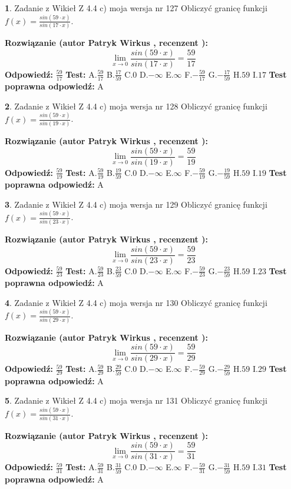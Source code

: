 \documentclass[12pt, a4paper]{article}
\theoremstyle{definition} %
\newtheorem{zad}{}
\newcommand{\zadStart}[1]{\begin{zad}#1\newline}
\newcommand{\zadStop}{\end{zad}}
\newcommand{\rozwStart}[2]{\noindent \textbf{Rozwiązanie (autor #1 , recenzent #2): }\newline}
\newcommand{\rozwStop}{\newline}
\newcommand{\odpStart}{\noindent \textbf{Odpowiedź:}\newline}
\newcommand{\odpStop}{\newline}
\newcommand{\testStart}{\noindent \textbf{Test:}\newline}
\newcommand{\testStop}{\newline}
\newcommand{\kluczStart}{\noindent \textbf{Test poprawna odpowiedź:}\newline}
\newcommand{\kluczStop}{\newline}
\begin{document}
\zadStart{Zadanie z Wikieł Z 4.4 c) moja wersja nr 127}
Obliczyć granicę funkcji $f(x)=\frac{sin(59\cdot x)}{sin(17\cdot x)}$.
\zadStop
\rozwStart{Patryk Wirkus}{}
$$\lim\limits_{x\to 0}\frac{sin(59\cdot x)}{sin(17\cdot x)}=
\frac{59}{17}$$
\rozwStop
\odpStart
$\frac{59}{17}$
\odpStop
\testStart
A.$\frac{59}{17}$
B.$\frac{17}{59}$
C.$0$
D.$-\infty$
E.$\infty$
F.$-\frac{59}{17}$
G.$-\frac{17}{59}$
H.$59$
I.$17$
\testStop
\kluczStart
A
\kluczStop



\zadStart{Zadanie z Wikieł Z 4.4 c) moja wersja nr 128}
Obliczyć granicę funkcji $f(x)=\frac{sin(59\cdot x)}{sin(19\cdot x)}$.
\zadStop
\rozwStart{Patryk Wirkus}{}
$$\lim\limits_{x\to 0}\frac{sin(59\cdot x)}{sin(19\cdot x)}=
\frac{59}{19}$$
\rozwStop
\odpStart
$\frac{59}{19}$
\odpStop
\testStart
A.$\frac{59}{19}$
B.$\frac{19}{59}$
C.$0$
D.$-\infty$
E.$\infty$
F.$-\frac{59}{19}$
G.$-\frac{19}{59}$
H.$59$
I.$19$
\testStop
\kluczStart
A
\kluczStop



\zadStart{Zadanie z Wikieł Z 4.4 c) moja wersja nr 129}
Obliczyć granicę funkcji $f(x)=\frac{sin(59\cdot x)}{sin(23\cdot x)}$.
\zadStop
\rozwStart{Patryk Wirkus}{}
$$\lim\limits_{x\to 0}\frac{sin(59\cdot x)}{sin(23\cdot x)}=
\frac{59}{23}$$
\rozwStop
\odpStart
$\frac{59}{23}$
\odpStop
\testStart
A.$\frac{59}{23}$
B.$\frac{23}{59}$
C.$0$
D.$-\infty$
E.$\infty$
F.$-\frac{59}{23}$
G.$-\frac{23}{59}$
H.$59$
I.$23$
\testStop
\kluczStart
A
\kluczStop



\zadStart{Zadanie z Wikieł Z 4.4 c) moja wersja nr 130}
Obliczyć granicę funkcji $f(x)=\frac{sin(59\cdot x)}{sin(29\cdot x)}$.
\zadStop
\rozwStart{Patryk Wirkus}{}
$$\lim\limits_{x\to 0}\frac{sin(59\cdot x)}{sin(29\cdot x)}=
\frac{59}{29}$$
\rozwStop
\odpStart
$\frac{59}{29}$
\odpStop
\testStart
A.$\frac{59}{29}$
B.$\frac{29}{59}$
C.$0$
D.$-\infty$
E.$\infty$
F.$-\frac{59}{29}$
G.$-\frac{29}{59}$
H.$59$
I.$29$
\testStop
\kluczStart
A
\kluczStop



\zadStart{Zadanie z Wikieł Z 4.4 c) moja wersja nr 131}
Obliczyć granicę funkcji $f(x)=\frac{sin(59\cdot x)}{sin(31\cdot x)}$.
\zadStop
\rozwStart{Patryk Wirkus}{}
$$\lim\limits_{x\to 0}\frac{sin(59\cdot x)}{sin(31\cdot x)}=
\frac{59}{31}$$
\rozwStop
\odpStart
$\frac{59}{31}$
\odpStop
\testStart
A.$\frac{59}{31}$
B.$\frac{31}{59}$
C.$0$
D.$-\infty$
E.$\infty$
F.$-\frac{59}{31}$
G.$-\frac{31}{59}$
H.$59$
I.$31$
\testStop
\kluczStart
A
\kluczStop
\end{document}
